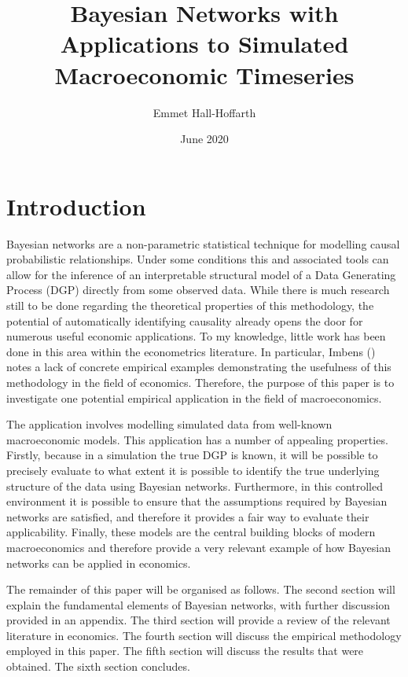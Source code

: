 \documentclass{article}
\title{Bayesian Networks with Applications to Simulated Macroeconomic Timeseries}
\author{Emmet Hall-Hoffarth}
\date{June 2020}
\begin{document}
\maketitle

\section{Introduction}

Bayesian networks \parencite{pearl2018book} are a non-parametric statistical technique for modelling causal probabilistic relationships. Under some conditions this and associated tools can allow for the inference of an interpretable structural model of a Data Generating Process (DGP) directly from some observed data. While there is much research still to be done regarding the theoretical properties of this methodology, the potential of automatically identifying causality already opens the door for numerous useful economic applications. To my knowledge, little work has been done in this area within the econometrics literature. In particular, Imbens (\citeyear{imbens2019potential}) notes a lack of concrete empirical examples demonstrating the usefulness of this methodology in the field of economics. Therefore, the purpose of this paper is to investigate one potential empirical application in the field of macroeconomics. 

The application involves modelling simulated data from well-known macroeconomic models. This application has a number of appealing properties. Firstly, because in a simulation the true DGP is known, it will be possible to precisely evaluate to what extent it is possible to identify the true underlying structure of the data using Bayesian networks. Furthermore, in this controlled environment it is possible to ensure that the assumptions required by Bayesian networks are satisfied, and therefore it provides a fair way to evaluate their applicability. Finally, these models are the central building blocks of modern macroeconomics and therefore provide a very relevant example of how Bayesian networks can be applied in economics.

The remainder of this paper will be organised as follows. The second section will explain the fundamental elements of Bayesian networks, with further discussion provided in an appendix. The third section will provide a review of the relevant literature in economics. The fourth section will discuss the empirical methodology employed in this paper. The fifth section will discuss the results that were obtained. The sixth section concludes.
\end{document}
